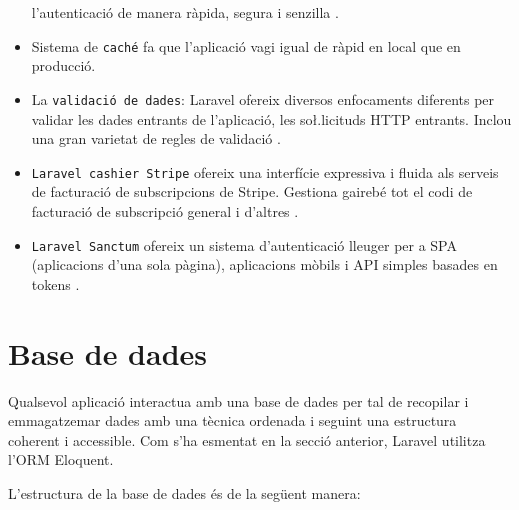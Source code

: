 \begin{itemize}
    l'autenticació de manera ràpida, segura i senzilla \autocite{auth_laravel}.
    \item Sistema de \texttt{caché} fa que l'aplicació vagi igual de ràpid en local que en producció.
    \item La \texttt{validació de dades}: Laravel ofereix diversos enfocaments diferents per validar
    les dades entrants de l'aplicació, les so\l.licituds HTTP entrants. Inclou una gran varietat de
    regles de validació \autocite{validacio_dades_laravel}.
    \item \texttt{Laravel cashier Stripe} ofereix una interfície expressiva i fluida als serveis de
    facturació de subscripcions de Stripe. Gestiona gairebé tot el codi de facturació de subscripció general i
    d'altres \autocite{cashier_laravel}.
    \item \texttt{Laravel Sanctum} ofereix un sistema d'autenticació lleuger per a SPA
    (aplicacions d'una sola pàgina), aplicacions mòbils i API simples basades en tokens \autocite{sanctum_laravel}.
\end{itemize}

\section{Base de dades}
\label{chap:base_dades}

Qualsevol aplicació interactua amb una base de dades per tal de recopilar i emmagatzemar dades
amb una tècnica ordenada i seguint una estructura coherent i accessible.
Com s'ha esmentat en la secció anterior, Laravel utilitza l'ORM Eloquent.

L'estructura de la base de dades és de la següent manera:

